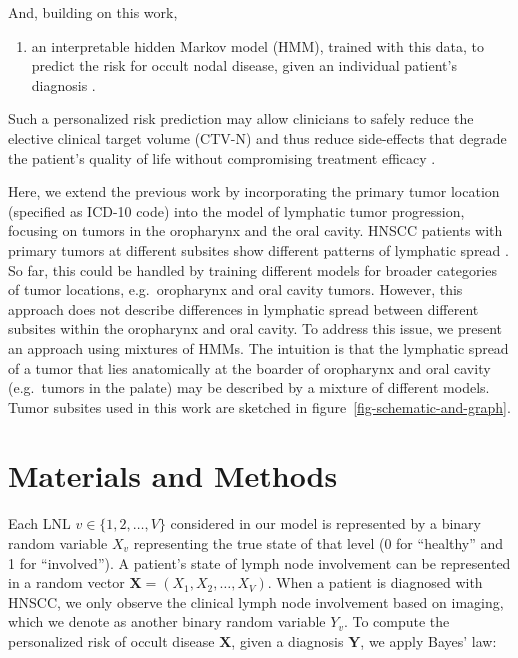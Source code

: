 \documentclass[11pt,twocolumn,twoside]{article}
\providecommand{\tightlist}{%
  \setlength{\itemsep}{0pt}\setlength{\parskip}{0pt}}\usepackage{longtable,booktabs,array}
\begin{document}
And, building on this work,

\begin{enumerate}
\def\labelenumi{\arabic{enumi}.}
\setcounter{enumi}{1}
\tightlist
\item
  an interpretable hidden Markov model (HMM), trained with this data, to
  predict the risk for occult nodal disease, given an individual
  patient's diagnosis \autocite{ludwig_hidden_2021}.
\end{enumerate}

Such a personalized risk prediction may allow clinicians to safely
reduce the elective clinical target volume (CTV-N) and thus reduce
side-effects that degrade the patient's quality of life without
compromising treatment efficacy \autocite{batth_practical_2014}.

Here, we extend the previous work by incorporating the primary tumor
location (specified as ICD-10 code) into the model of lymphatic tumor
progression, focusing on tumors in the oropharynx and the oral cavity.
HNSCC patients with primary tumors at different subsites show different
patterns of lymphatic spread
\autocite{lindberg_distribution_1972,woolgar_histological_1999}. So far,
this could be handled by training different models for broader
categories of tumor locations, e.g.~oropharynx and oral cavity tumors.
However, this approach does not describe differences in lymphatic spread
between different subsites within the oropharynx and oral cavity. To
address this issue, we present an approach using mixtures of HMMs. The
intuition is that the lymphatic spread of a tumor that lies anatomically
at the boarder of oropharynx and oral cavity (e.g.~tumors in the palate)
may be described by a mixture of different models. Tumor subsites used
in this work are sketched in figure~\ref{fig-schematic-and-graph}.

\section{Materials and Methods}\label{sec-materials-and-methods}

Each LNL \(v \in \{ 1, 2, \ldots, V\}\) considered in our model is
represented by a binary random variable \(X_v\) representing the true
state of that level (0 for ``healthy'' and 1 for ``involved''). A
patient's state of lymph node involvement can be represented in a random
vector \(\mathbf{X} = \left( X_1, X_2, \ldots, X_V \right)\). When a
patient is diagnosed with HNSCC, we only observe the clinical lymph node
involvement based on imaging, which we denote as another binary random
variable \(Y_v\). To compute the personalized risk of occult disease
\(\mathbf{X}\), given a diagnosis \(\mathbf{Y}\), we apply Bayes' law:
\end{document}
